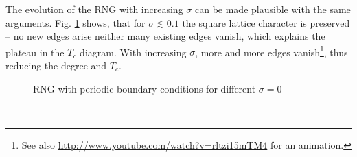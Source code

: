     The evolution of the RNG with increasing \(\sigma\) can be made plausible
    with the same arguments. Fig. \ref{fig:RNG_sigma}
    shows, that for \(\sigma \lesssim 0.1\) the square lattice character is
    preserved -- no new edges arise neither many existing edges vanish, which
    explains the plateau in the \(T_{c}\) diagram. With
    increasing \(\sigma\), more and more edges vanish\footnote{See also \url{http://www.youtube.com/watch?v=rltzi15mTM4} for an animation.},
    thus reducing the degree and \(T_{c}\).
    \begin{figure}[htbp]
        \centering

        \caption[Examples of RNG for different $\sigma$]
        {
            RNG with periodic boundary conditions for different \(\sigma = 0\)
        }
        \label{fig:RNG_sigma}
    \end{figure}\\
